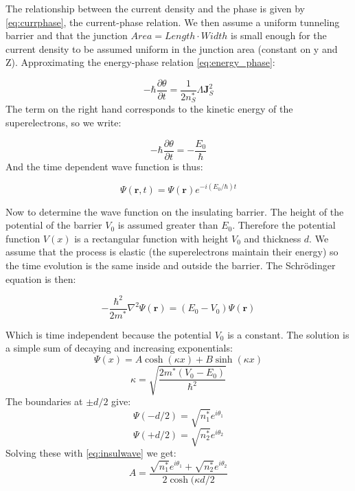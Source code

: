 \documentclass[12pt]{article}
\numberwithin{equation}{subsection}
\begin{document}
The relationship between the current density and the phase is given by \ref{eq:currphase}, the current-phase relation.
We then assume a uniform tunneling barrier  and that the junction $Area=Length\cdot Width$  is small enough for the current density to be assumed uniform in the junction area (constant on y and Z).
Approximating the energy-phase relation \ref{eq:energy_phase}:

\begin{equation}
    -\hbar \frac{\partial \theta}{\partial t}  = \frac{1}{2n^*_S} \Lambda \mathbf J^2_S
\end{equation}
The term on the right hand corresponds to the kinetic energy of the superelectrons, so we write:

\begin{equation}
    -\hbar \frac{\partial \theta}{\partial t}  = -\frac{E_0}{\hbar}
\end{equation}
And the time dependent wave function is thus:


\begin{equation}
    \Psi(\mathbf r,t) = \Psi(\mathbf r) e^{-i(E_0/\hbar)t}
\end{equation}

Now to determine the wave function on the insulating barrier. The height of the potential of the barrier $V_0$ is assumed greater than $E_0$. Therefore the potential function $V(x)$ is a rectangular function with height $V_0$ and thickness $d$. We assume that the process is elastic (the superelectrons maintain their energy) so the time evolution is the same inside and outside the barrier. The Schrödinger equation is then:

\begin{equation}
    -\frac{\hbar^2}{2m^*} \nabla ^2\Psi(\mathbf r) = (E_0-V_0)\Psi(\mathbf r)
\end{equation}

Which is time independent because the potential $V_0$ is a constant. The solution is a simple sum of decaying and increasing exponentials:
\begin{equation}
    \Psi(x) = A\cosh(\kappa x)+B\sinh(\kappa x)
    \label{eq:insulwave}
\end{equation}
\begin{equation}
    \kappa = \sqrt{\frac{2m^*(V_0-E_0)}{\hbar^2}}
\end{equation}
The boundaries at $\pm d/2$ give:
\begin{equation}
    \Psi(-d/2)  = \sqrt{n^*_1} e^{i\theta_1}
\end{equation}
\begin{equation}
    \Psi(+d/2)  = \sqrt{n^*_2} e^{i\theta_2}
\end{equation}
Solving these with \ref{eq:insulwave} we get:
\begin{equation}
    A = \frac{ \sqrt{n^*_1} e^{i\theta_1}+ \sqrt{n^*_2} e^{i\theta_2}}{2\cosh(\kappa d/2}
\end{equation}
\end{document}
